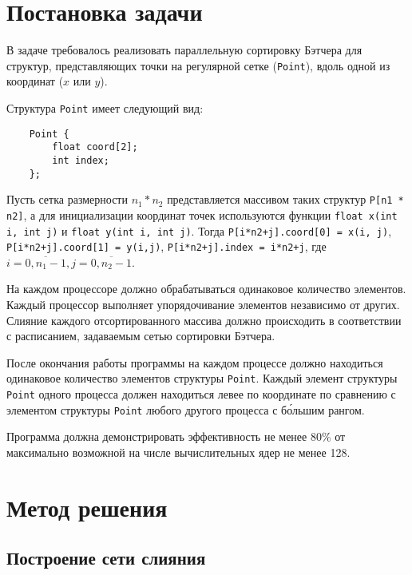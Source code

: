 \documentclass[oneside,final,14pt]{extreport}
\begin{document}
\tableofcontents

\chapter*{Постановка задачи}

В задаче требовалось реализовать параллельную сортировку Бэтчера для структур,
представляющих точки на регулярной сетке (\texttt{Point}), вдоль одной из
координат ($x$ или $y$).

Структура \texttt{Point} имеет следующий вид:
\begin{verbatim}
    Point {
        float coord[2];
        int index;
    };
\end{verbatim}

Пусть сетка размерности $n_1 * n_2$ представляется массивом таких структур
\texttt{P[n1 * n2]}, а для инициализации координат точек используются функции
\texttt{float x(int i, int j)} и \texttt{float y(int i, int j)}.
Тогда \texttt{P[i*n2+j].coord[0] = x(i, j)},
\texttt{P[i*n2+j].coord[1] = y(i,j)}, \texttt{P[i*n2+j].index = i*n2+j}, где $i = \overline{0, n_1-1},
j = \overline{0,n_2-1}$.

На каждом процессоре должно обрабатываться одинаковое количество элементов.
Каждый процессор выполняет упорядочивание элементов независимо от других.
Слияние каждого отсортированного массива должно происходить в соответствии с
расписанием, задаваемым сетью сортировки Бэтчера.

После окончания работы программы на каждом процессе должно находиться одинаковое
количество элементов структуры \texttt{Point}. Каждый элемент структуры
\texttt{Point} одного процесса должен находиться левее по координате
по сравнению с элементом структуры \texttt{Point} любого другого процесса с
б\'{о}льшим рангом.

Программа должна демонстрировать эффективность не менее 80\% от максимально
возможной на числе вычислительных ядер не менее 128.

\chapter*{Метод решения}

\section*{Построение сети слияния}
\end{document}
